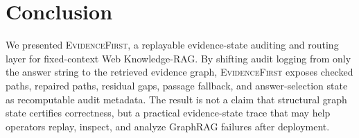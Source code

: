 \documentclass[runningheads,a4paper]{llncs}
\newcommand{\sys}{\textsc{EvidenceFirst}\xspace}
\begin{document}
\section{Conclusion}
\label{sec:conclusion}

We presented \sys, a replayable evidence-state auditing and routing layer for
fixed-context Web Knowledge-RAG. By shifting audit logging from only the
answer string to the retrieved evidence graph, \sys exposes checked paths,
repaired paths, residual gaps, passage fallback, and answer-selection state as
recomputable audit metadata. The result is not a claim that structural graph
state certifies correctness, but a practical evidence-state trace that may help
operators replay, inspect, and analyze GraphRAG failures after deployment.

\begingroup
\tiny
\setlength{\itemsep}{0pt}
\setlength{\parsep}{0pt}
\setlength{\parskip}{0pt}


\endgroup
\end{document}

